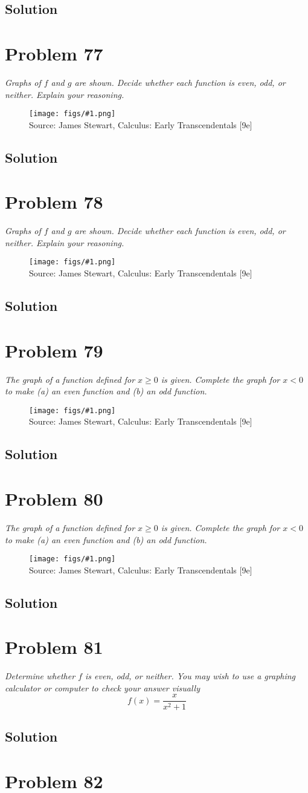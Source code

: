 \documentclass[11pt]{article}
\newcommand{\soln}{\subsection*}
\newcommand{\qn}{\textit}
\newcommand{\imagesource}[1]{{\footnotesize Source: #1}}
\newcommand{\imgqn}[1]{
	\begin{figure}[h]
		\centering
		\texttt{[image: figs/\#1.png]}\\
		\imagesource{James Stewart, Calculus: Early Transcendentals [9e]}
	\end{figure}
}
\begin{document}
\soln{Solution}

\section*{Problem 77}

\qn{Graphs of $f$ and $g$ are shown. Decide whether each function is even, odd, or neither. Explain your reasoning.}

\imgqn{1.1.77}

\soln{Solution}

\section*{Problem 78}

\qn{Graphs of $f$ and $g$ are shown. Decide whether each function is even, odd, or neither. Explain your reasoning.}

\imgqn{1.1.78}

\soln{Solution}

\section*{Problem 79}

\qn{The graph of a function defined for $x \ge 0$ is given. Complete the graph for $x<0$ to make (a) an even function and (b) an odd function.}

\imgqn{1.1.79}

\soln{Solution}

\section*{Problem 80}

\qn{The graph of a function defined for $x \ge 0$ is given. Complete the graph for $x<0$ to make (a) an even function and (b) an odd function.}

\imgqn{1.1.80}

\soln{Solution}

\section*{Problem 81}

\qn{Determine whether $f$ is even, odd, or neither. You may wish to use a graphing calculator or computer to check your answer visually $$f(x)=\frac{x}{x^2+1}$$}

\soln{Solution}

\section*{Problem 82}
\end{document}
